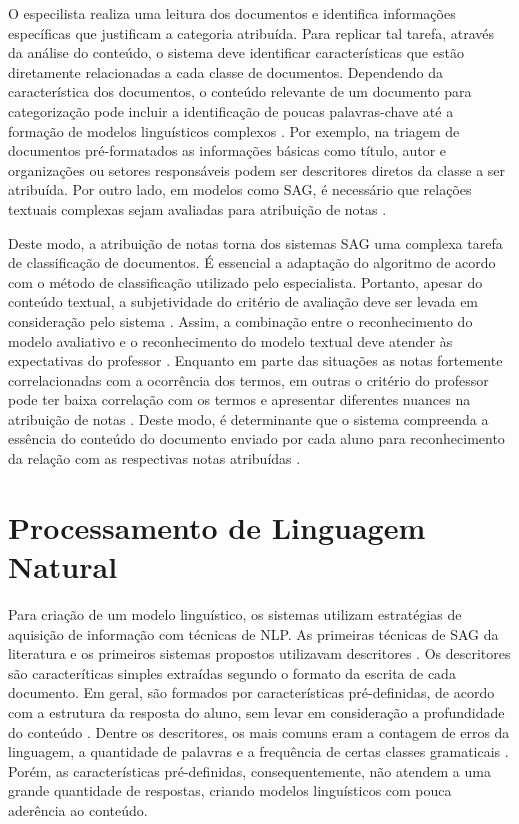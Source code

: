 O especilista realiza uma leitura dos documentos e identifica informações específicas que justificam a categoria atribuída. Para replicar tal tarefa, através da análise do conteúdo, o sistema deve identificar características que estão diretamente relacionadas a cada classe de documentos. Dependendo da característica dos documentos, o conteúdo relevante de um documento para categorização pode incluir a identificação de poucas palavras-chave até a formação de modelos linguísticos complexos \cite{jurafsky2009}. Por exemplo, na triagem de documentos pré-formatados as informações básicas como título, autor e organizações ou setores responsáveis podem ser descritores diretos da classe a ser atribuída. Por outro lado, em modelos como SAG, é necessário que relações textuais complexas sejam avaliadas para atribuição de notas \cite{paiva2012, yang2021}.

Deste modo, a atribuição de notas torna dos sistemas SAG uma complexa tarefa de classificação de documentos. É essencial a adaptação do algoritmo de acordo com o método de classificação utilizado pelo especialista. Portanto, apesar do conteúdo textual, a subjetividade do critério de avaliação deve ser levada em consideração pelo sistema \cite{pado2021}. Assim, a combinação entre o reconhecimento do modelo avaliativo e o reconhecimento do modelo textual deve atender às expectativas do professor \cite{condor2020}. Enquanto em parte das situações as notas fortemente correlacionadas com a ocorrência dos termos, em outras o critério do professor pode ter baixa correlação com os termos e apresentar diferentes nuances na atribuição de notas \cite{azad2020}. Deste modo, é determinante que o sistema compreenda a essência do conteúdo do documento enviado por cada aluno para reconhecimento da relação com as respectivas notas atribuídas \cite{mohler2011}.

\section{Processamento de Linguagem Natural}

Para criação de um modelo linguístico, os sistemas utilizam estratégias de aquisição de informação com técnicas de NLP. As primeiras técnicas de SAG da literatura e os primeiros sistemas propostos utilizavam descritores \cite{galhardi2018a}. Os descritores são caracteríticas simples extraídas segundo o formato da escrita de cada documento. Em geral, são formados por características pré-definidas, de acordo com a estrutura da resposta do aluno, sem levar em consideração a profundidade do conteúdo \cite{mohler2009}. Dentre os descritores, os mais comuns eram a contagem de erros da linguagem, a quantidade de palavras e a frequência de certas classes gramaticais \cite{riordan2019, galhardi2018b}. Porém, as características pré-definidas, consequentemente, não atendem a uma grande quantidade de respostas, criando modelos linguísticos com pouca aderência ao conteúdo.

